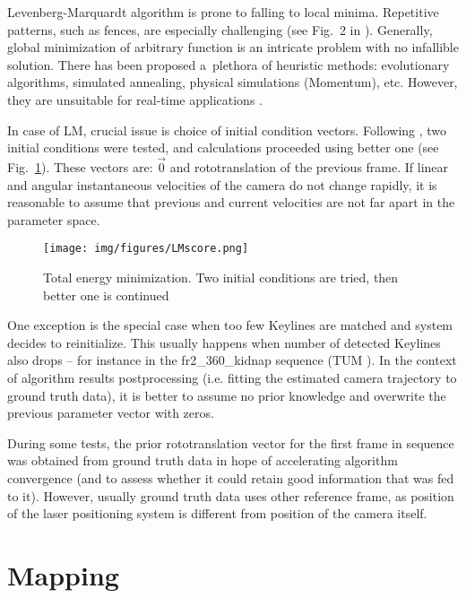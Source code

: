 Levenberg-Marquardt algorithm is prone to falling to local minima. Repetitive patterns, such as fences, are especially challenging (see Fig.~2 in \cite{parra2008robust}). Generally, global minimization of arbitrary function is an intricate problem with no infallible solution. There has been proposed a~plethora of heuristic methods: evolutionary algorithms, simulated annealing, physical simulations (Momentum), etc. However, they are unsuitable for real-time applications \cite{szeliski}.

In case of LM, crucial issue is choice of initial condition vectors. Following \cite{jose2015realtime}, two initial conditions were tested, and calculations proceeded using better one (see Fig.~\ref{fig:minim_score}). These vectors are: $\vec{0}$ and rototranslation of the previous frame. If linear and angular instantaneous velocities of the camera do not change rapidly, it is reasonable to assume that previous and current velocities are not far apart in the parameter space.

\begin{figure}[ht]
	\centering\texttt{[image: img/figures/LMscore.png]}
	\caption{ Total energy minimization. Two initial conditions are tried, then better one is continued }
	\label{fig:minim_score}
\end{figure}

One exception is the special case when too few Keylines are matched and system decides to reinitialize. This usually happens when number of detected Keylines also drops -- for instance in the fr2\_360\_kidnap sequence (TUM \cite{tum}). In the context of algorithm results postprocessing (i.e. fitting the estimated camera trajectory to ground truth data), it is better to assume no prior knowledge and overwrite the previous parameter vector with zeros.

During some tests, the prior rototranslation vector for the first frame in sequence was obtained from ground truth data in hope of accelerating algorithm convergence (and to assess whether it could retain good information that was fed to it). However, usually ground truth data uses other reference frame, as position of the laser positioning system is different from position of the camera itself.


\section{Mapping}

